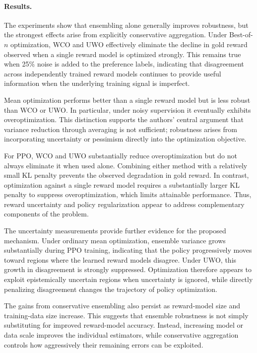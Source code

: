 \documentclass[11pt]{article}
\begin{document}
\paragraph{Results.}

The experiments show that ensembling alone generally improves robustness, but the strongest effects arise from explicitly conservative aggregation. Under Best-of-$n$ optimization, WCO and UWO effectively eliminate the decline in gold reward observed when a single reward model is optimized strongly. This remains true when 25\% noise is added to the preference labels, indicating that disagreement across independently trained reward models continues to provide useful information when the underlying training signal is imperfect.

Mean optimization performs better than a single reward model but is less robust than WCO or UWO. In particular, under noisy supervision it eventually exhibits overoptimization. This distinction supports the authors' central argument that variance reduction through averaging is not sufficient; robustness arises from incorporating uncertainty or pessimism directly into the optimization objective.

For PPO, WCO and UWO substantially reduce overoptimization but do not always eliminate it when used alone. Combining either method with a relatively small KL penalty prevents the observed degradation in gold reward. In contrast, optimization against a single reward model requires a substantially larger KL penalty to suppress overoptimization, which limits attainable performance. Thus, reward uncertainty and policy regularization appear to address complementary components of the problem.

The uncertainty measurements provide further evidence for the proposed mechanism. Under ordinary mean optimization, ensemble variance grows substantially during PPO training, indicating that the policy progressively moves toward regions where the learned reward models disagree. Under UWO, this growth in disagreement is strongly suppressed. Optimization therefore appears to exploit epistemically uncertain regions when uncertainty is ignored, while directly penalizing disagreement changes the trajectory of policy optimization.

The gains from conservative ensembling also persist as reward-model size and training-data size increase. This suggests that ensemble robustness is not simply substituting for improved reward-model accuracy. Instead, increasing model or data scale improves the individual estimators, while conservative aggregation controls how aggressively their remaining errors can be exploited.
\end{document}
